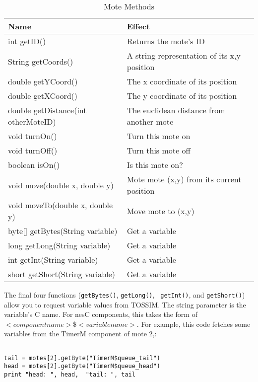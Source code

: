 \documentclass[10pt]{article}
\begin{document}
\begin{table}
\centering
\begin{tabular}{|l|l|} \hline
Name                                & Effect \\ \hline
int getID()                         & Returns the mote's ID\\
String getCoords()                  & A string representation of its x,y position\\
double getYCoord()                  & The x coordinate of its position\\
double getXCoord()                  & The y coordinate of its position\\
double getDistance(int otherMoteID) & The euclidean distance from another mote\\
void turnOn()                       & Turn this mote on\\
void turnOff()                      & Turn this mote off\\
boolean isOn()                      & Is this mote on?\\
void move(double x, double y)       & Mote mote (x,y) from its current position\\
void moveTo(double x, double y)     & Move mote to (x,y)\\
byte[] getBytes(String variable)    & Get a variable\\
long getLong(String variable)       & Get a variable\\
int getInt(String variable)         & Get a variable\\
short getShort(String variable)     & Get a variable\\ \hline
\end{tabular}
\caption{Mote Methods}
\label{table:motes}
\end{table}

The final four functions ({\tt getBytes()}, {\tt getLong()}, {\tt
getInt()}, and {\tt getShort()}) allow you to request variable values
from TOSSIM. The string parameter is the variable's C name. For nesC
components, this takes the form of $<component name>$\$$<variable
name>$. For example, this code fetches some variables from the TimerM
component of mote 2,:

\begin{verbatim}

tail = motes[2].getByte("TimerM$queue_tail")
head = motes[2].getByte("TimerM$queue_head")
print "head: ", head,  "tail: ", tail

\end{verbatim}
\end{document}
